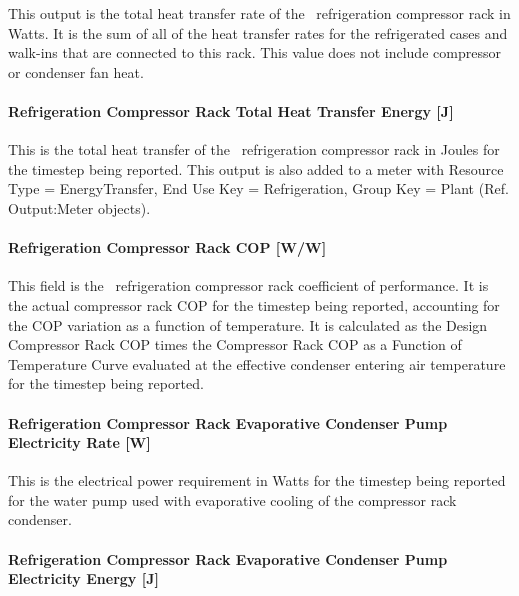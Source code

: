 This output is the total heat transfer rate of the~ refrigeration compressor rack in Watts. It is the sum of all of the heat transfer rates for the refrigerated cases and walk-ins that are connected to this rack. This value does not include compressor or condenser fan heat.

\paragraph{Refrigeration Compressor Rack Total Heat Transfer Energy {[}J{]}}\label{refrigeration-compressor-rack-total-heat-transfer-energy-j}

This is the total heat transfer of the~ refrigeration compressor rack in Joules for the timestep being reported. This output is also added to a meter with Resource Type = EnergyTransfer, End Use Key = Refrigeration, Group Key = Plant (Ref. Output:Meter objects).

\paragraph{Refrigeration Compressor Rack COP {[}W/W{]}}\label{refrigeration-compressor-rack-cop-ww}

This field is the~ refrigeration compressor rack coefficient of performance. It is the actual compressor rack COP for the timestep being reported, accounting for the COP variation as a function of temperature. It is calculated as the Design Compressor Rack COP times the Compressor Rack COP as a Function of Temperature Curve evaluated at the effective condenser entering air temperature for the timestep being reported.

\paragraph{Refrigeration Compressor Rack Evaporative Condenser Pump Electricity Rate {[}W{]}}\label{refrigeration-compressor-rack-evaporative-condenser-pump-electric-power-w}

This is the electrical power requirement in Watts for the timestep being reported for the water pump used with evaporative cooling of the compressor rack condenser.

\paragraph{Refrigeration Compressor Rack Evaporative Condenser Pump Electricity Energy {[}J{]}}\label{refrigeration-compressor-rack-evaporative-condenser-pump-electric-energy-j}

